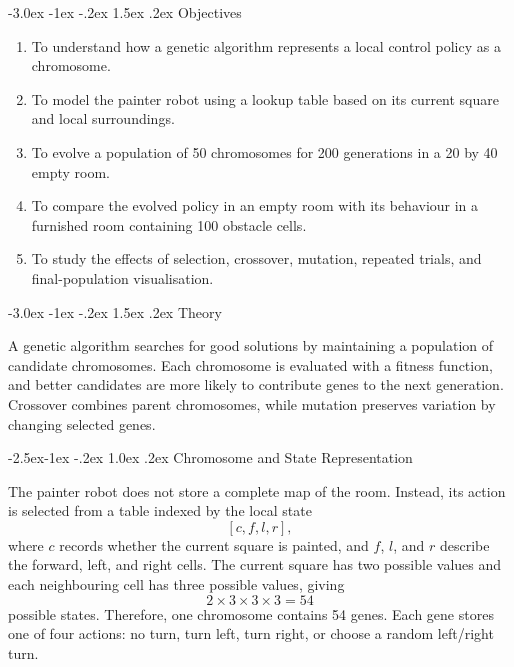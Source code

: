 \documentclass[12pt,a4paper]{article}
\makeatletter
\renewcommand{\section}{\@startsection{section}{1}{\z@}%
  {-3.0ex \@plus -1ex \@minus -.2ex}%
  {1.5ex \@plus.2ex}%
  {\normalfont\Large\bfseries\color{primaryblue}}}
\renewcommand{\subsection}{\@startsection{subsection}{2}{\z@}%
  {-2.5ex\@plus -1ex \@minus -.2ex}%
  {1.0ex \@plus .2ex}%
  {\normalfont\large\bfseries\color{accentblue}}}
\makeatother
\begin{document}
\tableofcontents
\newpage

\section{Objectives}

\begin{enumerate}
  \item To understand how a genetic algorithm represents a local control policy as a chromosome.
  \item To model the painter robot using a lookup table based on its current square and local surroundings.
  \item To evolve a population of 50 chromosomes for 200 generations in a 20 by 40 empty room.
  \item To compare the evolved policy in an empty room with its behaviour in a furnished room containing 100 obstacle cells.
  \item To study the effects of selection, crossover, mutation, repeated trials, and final-population visualisation.
\end{enumerate}

\section{Theory}

A genetic algorithm searches for good solutions by maintaining a population of candidate chromosomes.  Each chromosome is evaluated with a fitness function, and better candidates are more likely to contribute genes to the next generation.  Crossover combines parent chromosomes, while mutation preserves variation by changing selected genes.

\subsection{Chromosome and State Representation}

The painter robot does not store a complete map of the room.  Instead, its action is selected from a table indexed by the local state
\[
  [c,f,l,r],
\]
where $c$ records whether the current square is painted, and $f$, $l$, and $r$ describe the forward, left, and right cells.  The current square has two possible values and each neighbouring cell has three possible values, giving
\[
  2 \times 3 \times 3 \times 3 = 54
\]
possible states.  Therefore, one chromosome contains 54 genes.  Each gene stores one of four actions: no turn, turn left, turn right, or choose a random left/right turn.
\end{document}

